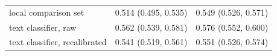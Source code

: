 \begin{tabular}{lrr}
local comparison set & 0.514 (0.495, 0.535) & 0.549 (0.526, 0.571) \\
text classifier, raw & 0.562 (0.539, 0.581) & 0.576 (0.552, 0.600) \\
text classifier, recalibrated & 0.541 (0.519, 0.561) & 0.551 (0.526, 0.574) \\
\bottomrule
\end{tabular}
